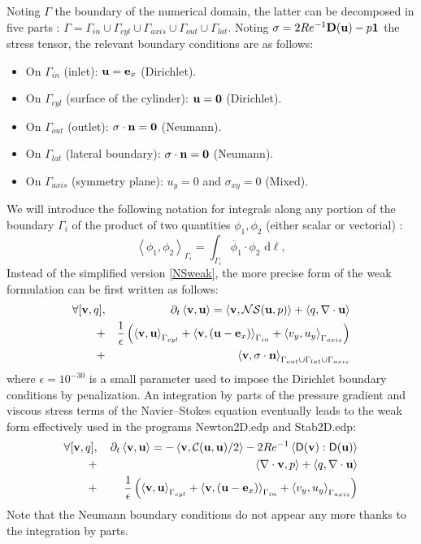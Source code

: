 \documentclass[twocolumn,10pt]{asme2ej}
\begin{document}
Noting $\Gamma$ the boundary of the numerical domain, the latter can be decomposed in five parts : 
$\Gamma = \Gamma_{in} \cup \Gamma_{cyl} \cup \Gamma_{axis} \cup \Gamma_{out} \cup \Gamma_{lat}$. 
Noting $\sigma = 2 Re^{-1} {\bf D}({\bf u}) - p {\bf 1}$ the stress tensor, the relevant boundary conditions are as follows:
\begin{itemize}
\item On $\Gamma_{in}$ (inlet): ${\bf u} = {\bf e}_x$ (Dirichlet).
\item On $\Gamma_{cyl}$ (surface of the cylinder): ${\bf u} = {\bf 0}$ (Dirichlet).
\item On $\Gamma_{out}$ (outlet): $\sigma \cdot {\bf n} = {\bf 0}$ (Neumann). 
\item On $\Gamma_{lat}$ (lateral boundary):  $\sigma \cdot {\bf n} = {\bf 0}$ (Neumann). 
\item On $\Gamma_{axis}$ (symmetry plane): $u_y = 0$ and $\sigma_{xy} = 0$ (Mixed). 
\end{itemize}
We will introduce the following notation for integrals along any portion of the boundary $\Gamma_i$ of the product of two quantities $\phi_1, \phi_2$ (either scalar or vectorial) :
$$
\left< \phi_1, \phi_2 \right>_{\Gamma_i} = \int_{\Gamma_i}  \overline{\phi}_1 \cdot \phi_2   \mbox{ d} \ell,
$$
Instead of the simplified version \ref{NSweak}, the more precise form of the weak formulation can be first written as follows:
\begin{eqnarray}
\label{NSweakFull}
\forall [{\bf v},q], &&\quad \partial_t \left< {\bf v}, {\bf u}\right> = \left< {\bf v} , {\cal NS} ({\bf u},p) \right> + \left< q, \nabla \cdot {\bf u}\right>\\
+ &&\frac{1}{\epsilon} \left(  \left< {\bf v}, \bf{u} \right>_{\Gamma_{cyl}} + \left< {\bf v}, ({\bf u}- {\bf e}_x ) \right>_{\Gamma_{in}} 
+ \left< v_y, u_y\right>_{\Gamma_{axis}} \right) \nonumber \\
+ && \left< {\bf v}, \sigma \cdot {\bf n} \right>_{\Gamma_{out} \cup  \Gamma_{lat} \cup \Gamma_{axis} }  \nonumber 
\end{eqnarray}
where $\epsilon=10^{-30}$ is a small parameter used to impose the Dirichlet boundary conditions by penalization.
An integration by parts of the pressure gradient and viscous stress terms of the Navier--Stokes equation eventually 
leads to the weak form effectively used in the programs {\sf Newton2D.edp} and {\sf Stab2D.edp}:
\begin{eqnarray}
\forall [{\bf v},q], &&\, \partial_t \left< {\bf v}, {\bf u}\right> = - \left< {\bf v} , {\cal C}({\bf u},{\bf u})/2 \right>
- 2 Re^{-1} \left< {\mathsf D}({\bf v}) : {\mathsf D}({\bf u})  \right>  \nonumber \\
+ &&\left< \nabla \cdot {\bf v}, p \right> + \left< q, \nabla \cdot {\bf u} \right> \label{NSweakFullN} \\
+ &&\frac{1}{\epsilon} \left(  \left< {\bf v}, \bf{u} \right>_{\Gamma_{cyl}} + \left< {\bf v}, ({\bf u}- {\bf e}_x ) \right>_{\Gamma_{in}} 
+ \left< v_y, u_y\right>_{\Gamma_{axis}} \right) \nonumber 
\end{eqnarray}
Note that the Neumann boundary conditions do not appear any more thanks to the integration by parts.
\end{document}

